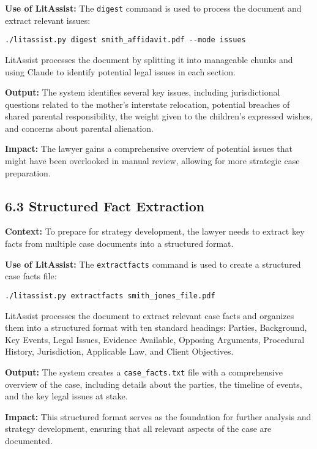 \documentclass[12pt,a4paper]{article}
\begin{document}
\textbf{Use of LitAssist:} The \texttt{digest} command is used to process the document and extract relevant issues:

\begin{verbatim}
./litassist.py digest smith_affidavit.pdf --mode issues
\end{verbatim}

LitAssist processes the document by splitting it into manageable chunks and using Claude to identify potential legal issues in each section.

\textbf{Output:} The system identifies several key issues, including jurisdictional questions related to the mother's interstate relocation, potential breaches of shared parental responsibility, the weight given to the children's expressed wishes, and concerns about parental alienation.

\textbf{Impact:} The lawyer gains a comprehensive overview of potential issues that might have been overlooked in manual review, allowing for more strategic case preparation.

\subsection*{6.3 Structured Fact Extraction}

\textbf{Context:} To prepare for strategy development, the lawyer needs to extract key facts from multiple case documents into a structured format.

\textbf{Use of LitAssist:} The \texttt{extractfacts} command is used to create a structured case facts file:

\begin{verbatim}
./litassist.py extractfacts smith_jones_file.pdf
\end{verbatim}

LitAssist processes the document to extract relevant case facts and organizes them into a structured format with ten standard headings: Parties, Background, Key Events, Legal Issues, Evidence Available, Opposing Arguments, Procedural History, Jurisdiction, Applicable Law, and Client Objectives.

\textbf{Output:} The system creates a \texttt{case\_facts.txt} file with a comprehensive overview of the case, including details about the parties, the timeline of events, and the key legal issues at stake.

\textbf{Impact:} This structured format serves as the foundation for further analysis and strategy development, ensuring that all relevant aspects of the case are documented.
\end{document}
